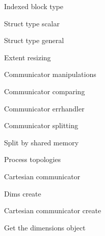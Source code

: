 \documentclass[10pt]{beamer}
\begin{document}
\begin{numberedframe}{Indexed block type}
  
\end{numberedframe}
\begin{numberedframe}{Struct type scalar}
  
\end{numberedframe}
\begin{numberedframe}{Struct type general}
  
\end{numberedframe}
\begin{numberedframe}{Extent resizing}
    
\end{numberedframe}

 {Communicator manipulations}

\begin{numberedframe}{Communicator comparing}
  
\end{numberedframe}
\begin{numberedframe}{Communicator errhandler}
  
\end{numberedframe}
\begin{numberedframe}{Communicator splitting}
  
\end{numberedframe}
\begin{numberedframe}{Split by shared memory}
  
\end{numberedframe}

 {Process topologies}

\begin{numberedframe}{Cartesian communicator}
  
\end{numberedframe}

\begin{numberedframe}{Dims create}
  
\end{numberedframe}

\begin{numberedframe}{Cartesian communicator create}
  
\end{numberedframe}

\begin{numberedframe}{Get the dimensions object}
  
\end{numberedframe}
\end{document}
